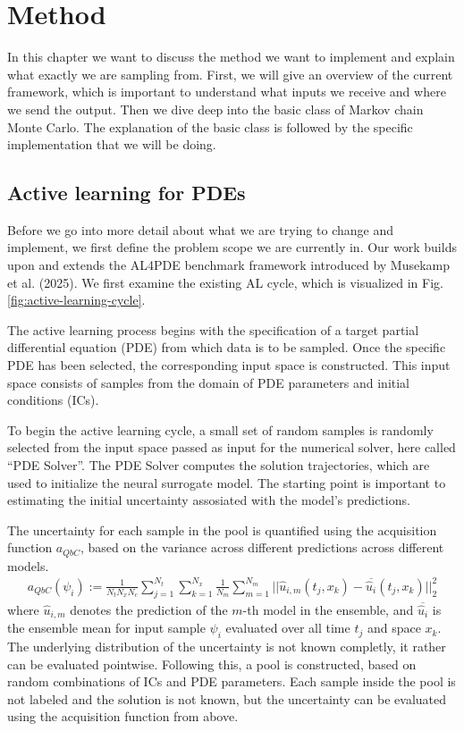 \chapter{Method}
In this chapter we want to discuss the method we want to implement and explain what exactly we are sampling from. First, we will give an overview of the current framework, which is important to understand what inputs we receive and where we send the output. Then we dive deep into the basic class of Markov chain Monte Carlo. The explanation of the basic class is followed by the specific implementation that we will be doing.
\section{Active learning for PDEs}
Before we go into more detail about what we are trying to change and implement, we first define the problem scope we are currently in. Our work builds upon and extends the AL4PDE benchmark framework introduced by Musekamp et al. (2025). We first examine the existing AL cycle, which is visualized in Fig.\ref{fig:active-learning-cycle}. 

The active learning process begins with the specification of a target partial differential equation (PDE) from which data is to be sampled. Once the specific PDE has been selected, the corresponding input space is constructed. This input space consists of samples from the domain of PDE parameters and initial conditions (ICs).

To begin the active learning cycle, a small set of random samples is randomly selected from the input space passed as input for the numerical solver, here called ``PDE Solver''. The PDE Solver computes the solution trajectories, which are used to initialize the neural surrogate model.  The starting point is important to estimating the initial uncertainty assosiated with the model's predictions.

The uncertainty for each sample in the pool is quantified using the acquisition function $a_{QbC}$, based on the variance across different predictions across different models.
\begin{align}
 a_{QbC}(\psi_i):=\frac{1}{N_tN_xN_c}\sum_{j=1}^{N_t}\sum_{k=1}^{N_x}\frac{1}{N_m}\sum_{m=1}^{N_m}\vert\vert\hat{u}_{i,m}(t_j,x_k)- \overline{\hat{u}_i}(t_j, x_k)\vert\vert^2_2
\end{align} 
where $\hat{u}_{i,m}$ denotes the prediction of the $m$-th model in the ensemble, and $\overline{\hat{u}_i}$ is the ensemble mean for input sample $\psi_i$ evaluated over all time $t_j$ and space $x_k$. The underlying distribution of the uncertainty is not known completly, it rather can be evaluated pointwise.
Following this, a pool is constructed, based on random combinations of ICs and PDE parameters. Each sample inside the pool is not labeled and the solution is not known, but the uncertainty can be evaluated using the acquisition function from above.

